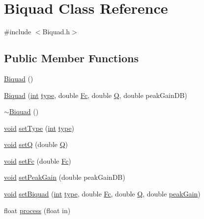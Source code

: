 \hypertarget{class_biquad}{}\section{Biquad Class Reference}
\label{class_biquad}


{\ttfamily \#include $<$Biquad.\+h$>$}

\subsection*{Public Member Functions}
\begin{DoxyCompactItemize}
\item 
\hyperlink{class_biquad_a52dca857188efd568cce9e763c1fcb82}{Biquad} ()
\item 
\hyperlink{class_biquad_ada943de98865e09aa4fb284f368c06de}{Biquad} (\hyperlink{tk_8h_a83f82f76e7fed06f4c49d2db94028a6d}{int} \hyperlink{class_biquad_adc7cf1c0aa8f3cb9287e686e35e8fdfb}{type}, double \hyperlink{class_biquad_a223165fbb9f80fa89ac932bb8701db8c}{Fc}, double \hyperlink{class_biquad_a7127af163ead5c37a030d97a5671e407}{Q}, double peak\+Gain\+DB)
\item 
\hyperlink{class_biquad_aff003d89792b3b5dfd2f5c9fb30ef44b}{$\sim$\+Biquad} ()
\item 
\hyperlink{tk_8h_aba408b7cd755a96426e004c015f5de8e}{void} \hyperlink{class_biquad_a2cb9d1f049c15282915b628284f75bb2}{set\+Type} (\hyperlink{tk_8h_a83f82f76e7fed06f4c49d2db94028a6d}{int} \hyperlink{class_biquad_adc7cf1c0aa8f3cb9287e686e35e8fdfb}{type})
\item 
\hyperlink{tk_8h_aba408b7cd755a96426e004c015f5de8e}{void} \hyperlink{class_biquad_a2bb9e12e3cecac96952c37f3c20b6e30}{setQ} (double \hyperlink{class_biquad_a7127af163ead5c37a030d97a5671e407}{Q})
\item 
\hyperlink{tk_8h_aba408b7cd755a96426e004c015f5de8e}{void} \hyperlink{class_biquad_a20fe8e31fcbaca47c66230e14b40a142}{set\+Fc} (double \hyperlink{class_biquad_a223165fbb9f80fa89ac932bb8701db8c}{Fc})
\item 
\hyperlink{tk_8h_aba408b7cd755a96426e004c015f5de8e}{void} \hyperlink{class_biquad_aaf1c3d49d7e50265d05578996e995649}{set\+Peak\+Gain} (double peak\+Gain\+DB)
\item 
\hyperlink{tk_8h_aba408b7cd755a96426e004c015f5de8e}{void} \hyperlink{class_biquad_a215b40b75328f9fb32d6f3a725d2ca8e}{set\+Biquad} (\hyperlink{tk_8h_a83f82f76e7fed06f4c49d2db94028a6d}{int} \hyperlink{class_biquad_adc7cf1c0aa8f3cb9287e686e35e8fdfb}{type}, double \hyperlink{class_biquad_a223165fbb9f80fa89ac932bb8701db8c}{Fc}, double \hyperlink{class_biquad_a7127af163ead5c37a030d97a5671e407}{Q}, double \hyperlink{class_biquad_aa3c93d845d4e455481c0ccbe52c58ff3}{peak\+Gain})
\item 
float \hyperlink{class_biquad_a3a5433af6f3d6f1b14fd304cd8cdd42e}{process} (float in)
\end{DoxyCompactItemize}
